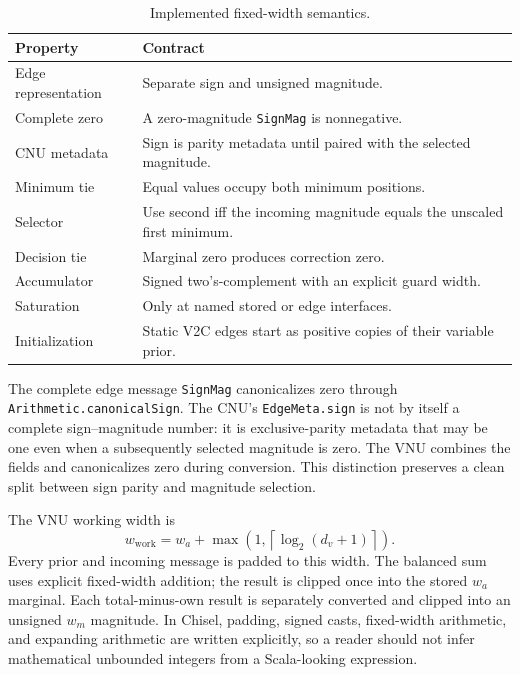 \documentclass[10pt,conference]{IEEEtran}
\begin{document}
\begin{table}[t]
\caption{Implemented fixed-width semantics.}
\label{tab:numeric-contract}
\centering
\small
\begin{tabular}{@{}p{}p{}@{}}
\toprule
Property & Contract \\
\midrule
Edge representation & Separate sign and unsigned magnitude. \\
Complete zero & A zero-magnitude \texttt{SignMag} is nonnegative. \\
CNU metadata & Sign is parity metadata until paired with the selected magnitude. \\
Minimum tie & Equal values occupy both minimum positions. \\
Selector & Use second iff the incoming magnitude equals the unscaled first minimum. \\
Decision tie & Marginal zero produces correction zero. \\
Accumulator & Signed two's-complement with an explicit guard width. \\
Saturation & Only at named stored or edge interfaces. \\
Initialization & Static V2C edges start as positive copies of their variable prior. \\
\bottomrule
\end{tabular}
\end{table}

The complete edge message \texttt{SignMag} canonicalizes zero through
\texttt{Arithmetic.canonicalSign}.  The CNU's \texttt{EdgeMeta.sign} is not by
itself a complete sign--magnitude number: it is exclusive-parity metadata that
may be one even when a subsequently selected magnitude is zero.  The VNU
combines the fields and canonicalizes zero during conversion.  This distinction
preserves a clean split between sign parity and magnitude selection.

The VNU working width is
\begin{equation}
 w_{\mathrm{work}}=w_a+
 \max\left(1,\left\lceil\log_2(d_v+1)\right\rceil\right).
\end{equation}
Every prior and incoming message is padded to this width.  The balanced sum
uses explicit fixed-width addition; the result is clipped once into the stored
$w_a$ marginal.  Each total-minus-own result is separately converted and
clipped into an unsigned $w_m$ magnitude.  In Chisel, padding, signed casts,
fixed-width arithmetic, and expanding arithmetic are written explicitly, so a
reader should not infer mathematical unbounded integers from a Scala-looking
expression.
\end{document}
